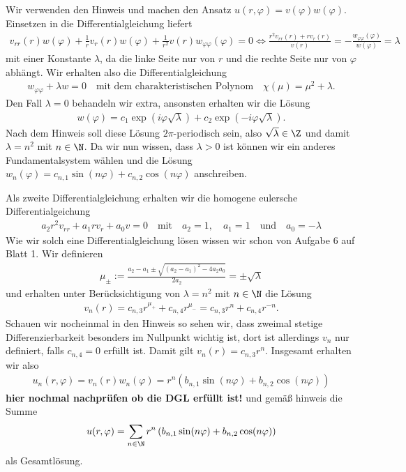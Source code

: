 \begin{solution}
	Wir verwenden den Hinweis und machen den Ansatz $u(r, \varphi) = v(\varphi) w(\varphi)$. Einsetzen in die Differentialgleichung liefert
	\begin{align*}
	v_{rr}(r)w(\varphi) + \frac{1}{r} v_r(r)w(\varphi) + \frac{1}{r^2} v(r)w_{\varphi\varphi}(\varphi) = 0 \Leftrightarrow \frac{r^2v_{rr}(r) + rv_r(r)}{v(r)} = -\frac{w_{\varphi\varphi}(\varphi)}{w(\varphi)} = \lambda
	\end{align*}
	mit einer Konstante $\lambda$, da die linke Seite nur von $r$ und die rechte Seite nur von $\varphi$ abhängt. Wir erhalten also die Differentialgleichung 
	\begin{align*}
	w_{\varphi\varphi} + \lambda w = 0 \quad \text{mit dem charakteristischen Polynom} \quad \chi(\mu) = \mu^2 + \lambda.
	\end{align*}
	Den Fall $\lambda = 0$ behandeln wir extra, ansonsten erhalten wir die Lösung 
	\begin{align*}
	w(\varphi) = c_1 \exp\left(i \varphi \sqrt{\lambda} \right) + c_2 \exp\left(-i \varphi \sqrt{\lambda} \right).
	\end{align*}
	Nach dem Hinweis soll diese Lösung $2\pi$-periodisch sein, also $\sqrt{\lambda} \in \Z$ und damit $\lambda = n^2$ mit $n \in \N$. Da wir nun wissen, dass $\lambda > 0$ ist können wir ein anderes Fundamentalsystem wählen und die Lösung $w_n(\varphi) = c_{n,1} \sin(n\varphi) + c_{n,2} \cos(n\varphi)$ anschreiben.
	
	Als zweite Differentialgleichung erhalten wir die homogene eulersche Differentialgeichung 
	\begin{align*}
	a_2 r^2 v_{rr} + a_1 r v_r + a_0 v = 0 \quad \text{mit} \quad a_2 = 1, \quad a_1 = 1 \quad \text{und} \quad a_0 = -\lambda
	\end{align*}
	Wie wir solch eine Differentialgleichung lösen wissen wir schon von Aufgabe 6 auf Blatt 1. Wir definieren 
	\begin{align*}
	\mu_\pm := \frac{a_2 - a_1 \pm \sqrt{(a_2 - a_1)^2 - 4a_2a_0}}{2a_2} = \pm \sqrt{\lambda}  
	\end{align*}
	und erhalten unter Berücksichtigung von $\lambda = n^2$ mit $n \in \N$ die Lösung
	\begin{align*}
	v_n(r) = c_{n,3} r^{\mu_+} + c_{n,4} r^{\mu_-} = c_{n,3} r^{n} + c_{n,4} r^{-n}.
	\end{align*}
	Schauen wir nocheinmal in den Hinweis so sehen wir, dass zweimal stetige Differenzierbarkeit besonders im Nullpunkt wichtig ist, dort ist allerdings $v_n$ nur definiert, falls $c_{n,4} = 0$ erfüllt ist. Damit gilt $v_n(r) = c_{n,3} r^{n}$.
	Insgesamt erhalten wir also 
	\begin{align*}
	u_n(r,\varphi) = v_n(r) w_n(\varphi) = r^n \left(b_{n,1} \sin(n\varphi) + b_{n,2} \cos(n\varphi)\right)
	\end{align*}
	\textbf{hier nochmal nachprüfen ob die DGL erfüllt ist!}
	und gemäß hinweis die Summe
	\begin{align*}
	u(r, \varphi) = \sum_{n \in \N} r^n \left(b_{n,1} \sin(n\varphi) + b_{n,2} \cos(n\varphi)\right)
	\end{align*}
	als Gesamtlösung.
\end{solution}

